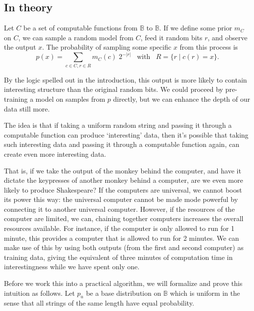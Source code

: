 \documentclass{article} %
\newcommand{\B}{\mathbb B}
\newcommand{\p}{\text{.}}
\begin{document}
\subsection{In theory}

Let $C$ be a set of computable functions from $\B$ to $\B$. If we define some prior $m_C$ on $C$, we can sample a random model from $C$, feed it random bits $r$, and observe the output $x$. The probability of sampling some specific $x$ from this process is 
\[
p(x) = \sum_{c\in C,r \in R} m_C(c)\;2^{-|r|} \;\;\;\text{with}\;\;\; R = \{r \mid c(r) = x\}\p 
\]

By the logic spelled out in the introduction, this output is more likely to contain interesting structure than the original random bits. We could proceed by pre-training a model on samples from $p$ directly, but we can enhance the depth of our data still more. 

The idea is that if taking a uniform random string and passing it through a computable function can produce `interesting' data, then it's possible that taking such interesting data and passing it through a computable function again, can create even more interesting data. 

That is, if we take the output of the monkey behind the computer, and have it dictate the keypresses of another monkey behind a computer, are we even more likely to produce Shakespeare? If the computers are universal, we cannot boost its power this way: the universal computer cannot be made mode powerful by connecting it to another universal computer. However, if the resources of the computer are limited, we can, chaining together computers increases the overall resources available. For instance, if the computer is only allowed to run for 1 minute, this provides a computer that is allowed to run for 2 minutes. We can make use of this by using both outputs (from the first and second computer) as training data, giving the equivalent of three minutes of computation time in interestingness while we have spent only one.\footnotemark


Before we work this into a practical algorithm, we will formalize and prove this intuition as follows. Let $p_u$ be a base distribution on $\B$ which is uniform in the sense that all strings of the same length have equal probability.
\end{document}
